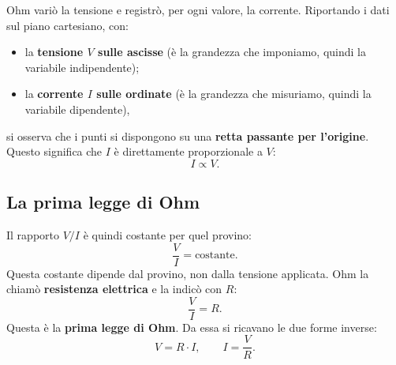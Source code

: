 \begin{figure}[htbp]
\centering
{}
\end{figure}


Ohm variò la tensione e registrò, per ogni valore, la corrente. Riportando i dati sul piano cartesiano, con:
\begin{itemize}[leftmargin=1cm]
  \item la \textbf{tensione \(V\) sulle ascisse} (è la grandezza che imponiamo, quindi la variabile indipendente);
  \item la \textbf{corrente \(I\) sulle ordinate} (è la grandezza che misuriamo, quindi la variabile dipendente),
\end{itemize}
si osserva che i punti si dispongono su una \textbf{retta passante per l'origine}. Questo significa che \(I\) è direttamente proporzionale a \(V\):
\[
I \propto V.
\]



\subsection{La prima legge di Ohm}
Il rapporto \(V/I\) è quindi costante per quel provino:
\[
\frac{V}{I} = \text{costante}.
\]
Questa costante dipende dal provino, non dalla tensione applicata. Ohm la chiamò \textbf{resistenza elettrica} e la indicò con \(R\):
\[
\frac{V}{I} = R.
\]
Questa è la \textbf{prima legge di Ohm}. Da essa si ricavano le due forme inverse:
\[
V = R \cdot I, \qquad I = \frac{V}{R}.
\]


